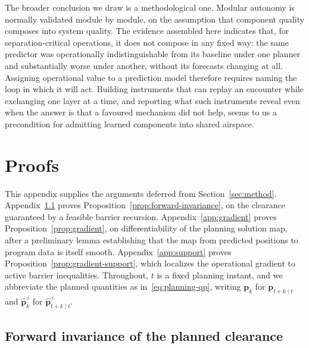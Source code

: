 \documentclass[11pt]{article}
\theoremstyle{plain}
\theoremstyle{definition}
\begin{document}
The broader conclusion we draw is a methodological one. Modular
autonomy is normally validated module by module, on the assumption that
component quality composes into system quality. The evidence assembled
here indicates that, for separation-critical operations, it does not
compose in any fixed way: the same predictor was operationally
indistinguishable from its baseline under one planner and substantially
worse under another, without its forecasts changing at all. Assigning
operational value to a prediction model therefore requires naming the
loop in which it will act. Building instruments that can replay an
encounter while exchanging one layer at a time, and reporting what such
instruments reveal even when the answer is that a favoured mechanism
did not help, seems to us a precondition for admitting learned
components into shared airspace.

%



\FloatBarrier
\appendix
\section{Proofs}
\label{app:proofs}

This appendix supplies the arguments deferred from
Section~\ref{sec:method}. Appendix~\ref{app:invariance} proves
Proposition~\ref{prop:forward-invariance}, on the clearance guaranteed
by a feasible barrier recursion. Appendix~\ref{app:gradient} proves
Proposition~\ref{prop:gradient}, on differentiability of the planning
solution map, after a preliminary lemma establishing that the map from
predicted positions to program data is itself smooth.
Appendix~\ref{app:support} proves
Proposition~\ref{prop:gradient-support}, which localizes the
operational gradient to active barrier inequalities. Throughout,
$t$ is a fixed planning instant, and we abbreviate the planned
quantities as in~\eqref{eq:planning-qp}, writing $\bm{p}_k$ for
$\bm{p}_{t+k\mid t}$ and $\hat{\bm{p}}^{\,i}_{k}$ for
$\hat{\bm{p}}^{\,i}_{t+k\mid t}$.

\subsection{Forward invariance of the planned clearance}
\label{app:invariance}
\end{document}
